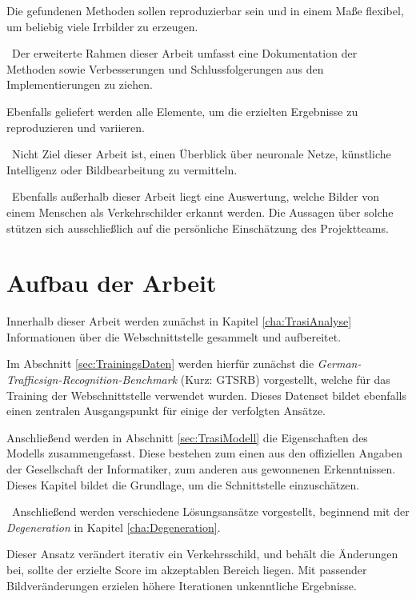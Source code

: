 Die gefundenen Methoden sollen reproduzierbar sein und in einem Maße flexibel, um beliebig viele Irrbilder zu erzeugen. 

~\newline Der erweiterte Rahmen dieser Arbeit umfasst eine Dokumentation der Methoden sowie Verbesserungen und Schlussfolgerungen aus den Implementierungen zu ziehen. 

Ebenfalls geliefert werden alle Elemente, um die erzielten Ergebnisse zu reproduzieren und variieren. 

~\newline Nicht Ziel dieser Arbeit ist, einen Überblick über neuronale Netze, künstliche Intelligenz oder Bildbearbeitung zu vermitteln. 

~\newline Ebenfalls außerhalb dieser Arbeit liegt eine Auswertung, welche Bilder von einem Menschen als Verkehrschilder erkannt werden. Die Aussagen über solche stützen sich ausschließlich auf die persönliche Einschätzung des Projektteams. 
\section{Aufbau der Arbeit}
Innerhalb dieser Arbeit werden zunächst in Kapitel \ref{cha:TrasiAnalyse} Informationen über die Webschnittstelle gesammelt und aufbereitet. 

Im Abschnitt \ref{sec:TrainingsDaten} werden hierfür zunächst die \textit{German-Trafficsign-Recognition-Benchmark} (Kurz: GTSRB) vorgestellt, welche für das Training der Webschnittstelle verwendet wurden. Dieses Datenset bildet ebenfalls einen zentralen Ausgangspunkt für einige der verfolgten Ansätze.

Anschließend werden in Abschnitt \ref{sec:TrasiModell} die Eigenschaften des Modells zusammengefasst. 
Diese bestehen zum einen aus den offiziellen Angaben der Gesellschaft der Informatiker, zum anderen aus gewonnenen Erkenntnissen. Dieses Kapitel bildet die Grundlage, um die Schnittstelle einzuschätzen. 

~\newline Anschließend werden verschiedene Lösungsansätze vorgestellt, beginnend mit der \textit{Degeneration} in Kapitel \ref{cha:Degeneration}. 

Dieser Ansatz verändert iterativ ein Verkehrsschild, und behält die Änderungen bei, sollte der erzielte Score im akzeptablen Bereich liegen. Mit passender Bildveränderungen erzielen höhere Iterationen unkenntliche Ergebnisse. 

